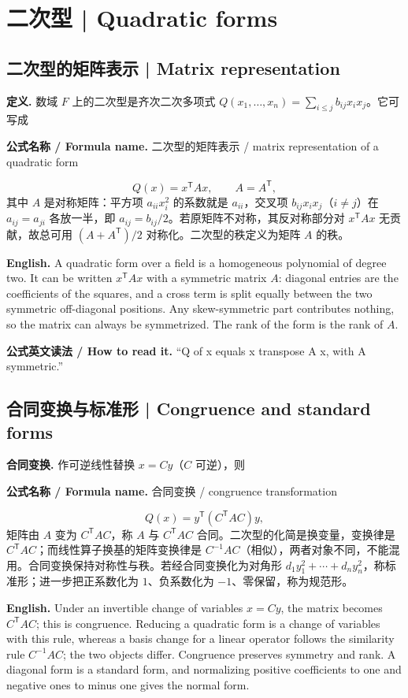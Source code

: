 \documentclass[UTF8,11pt,a4paper]{ctexart}
\newcommand{\EN}[1]{\par\noindent\textbf{English.} #1\par}
\newcommand{\READ}[1]{\par\noindent\textbf{公式英文读法 / How to read it.} #1\par}
\newcommand{\FORMULA}[2]{\par\noindent\textbf{公式名称 / Formula name.} #1 / #2\par}
\begin{document}
\section{二次型 | Quadratic forms}
\subsection{二次型的矩阵表示 | Matrix representation}
\noindent\textbf{定义.} 数域 $F$ 上的二次型是齐次二次多项式 $Q(x_1,\dots,x_n)=\sum_{i\le j}b_{ij}x_ix_j$。它可写成
\FORMULA{二次型的矩阵表示}{matrix representation of a quadratic form}
\[
Q(x)=x^{\mathsf T}Ax,\qquad A=A^{\mathsf T},
\]
其中 $A$ 是对称矩阵：平方项 $a_{ii}x_i^2$ 的系数就是 $a_{ii}$，交叉项 $b_{ij}x_ix_j$（$i\ne j$）在 $a_{ij}=a_{ji}$ 各放一半，即 $a_{ij}=b_{ij}/2$。若原矩阵不对称，其反对称部分对 $x^{\mathsf T}Ax$ 无贡献，故总可用 $(A+A^{\mathsf T})/2$ 对称化。二次型的秩定义为矩阵 $A$ 的秩。
\EN{A quadratic form over a field is a homogeneous polynomial of degree two. It can be written $x^{\mathsf T}Ax$ with a symmetric matrix $A$: diagonal entries are the coefficients of the squares, and a cross term is split equally between the two symmetric off-diagonal positions. Any skew-symmetric part contributes nothing, so the matrix can always be symmetrized. The rank of the form is the rank of $A$.}
\READ{``Q of x equals x transpose A x, with A symmetric.''}

\subsection{合同变换与标准形 | Congruence and standard forms}
\noindent\textbf{合同变换.} 作可逆线性替换 $x=Cy$（$C$ 可逆），则
\FORMULA{合同变换}{congruence transformation}
\[
Q(x)=y^{\mathsf T}(C^{\mathsf T}AC)y,
\]
矩阵由 $A$ 变为 $C^{\mathsf T}AC$，称 $A$ 与 $C^{\mathsf T}AC$ 合同。二次型的化简是换变量，变换律是 $C^{\mathsf T}AC$；而线性算子换基的矩阵变换律是 $C^{-1}AC$（相似），两者对象不同，不能混用。合同变换保持对称性与秩。若经合同变换化为对角形 $d_1y_1^2+\cdots+d_ny_n^2$，称标准形；进一步把正系数化为 $1$、负系数化为 $-1$、零保留，称为规范形。
\EN{Under an invertible change of variables $x=Cy$, the matrix becomes $C^{\mathsf T}AC$; this is congruence. Reducing a quadratic form is a change of variables with this rule, whereas a basis change for a linear operator follows the similarity rule $C^{-1}AC$; the two objects differ. Congruence preserves symmetry and rank. A diagonal form is a standard form, and normalizing positive coefficients to one and negative ones to minus one gives the normal form.}
\end{document}
